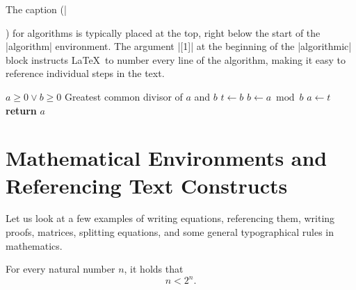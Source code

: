 \documentclass[9pt]{style/friteza}
\begin{document}
The caption (\ltx|\caption|) for algorithms is typically placed at the top, right below the start of the \ltx|algorithm| environment. The argument \ltx|[1]| at the beginning of the \ltx|algorithmic| block instructs \LaTeX\ to number every line of the algorithm, making it easy to reference individual steps in the text.

\begin{algorithm}[htbp]
\caption{Euclid's algorithm for finding the greatest common divisor}
\label{alg:evklid}
\begin{algorithmic}[1] 
    \Require $a \geq 0 \lor b \geq 0$ %
    \Ensure Greatest common divisor of $a$ and $b$ %
    \Statex %
            \State $t \gets b$
            \State $b \gets a \bmod b$
            \State $a \gets t$
        \EndWhile
        \State \textbf{return} $a$
    \EndProcedure
\end{algorithmic}
\end{algorithm}

\section{Mathematical Environments and Referencing Text Constructs}
\label{sec:mat}

Let us look at a few examples of writing equations, referencing them, writing proofs, matrices, splitting equations, and some general typographical rules in mathematics.
\begin{theorem}
  \label{iz:1}
  For every natural number $n$, it holds that
  \begin{equation}
    n < 2^n.
    \label{eq:1}
  \end{equation}
\end{theorem}
\end{document}
